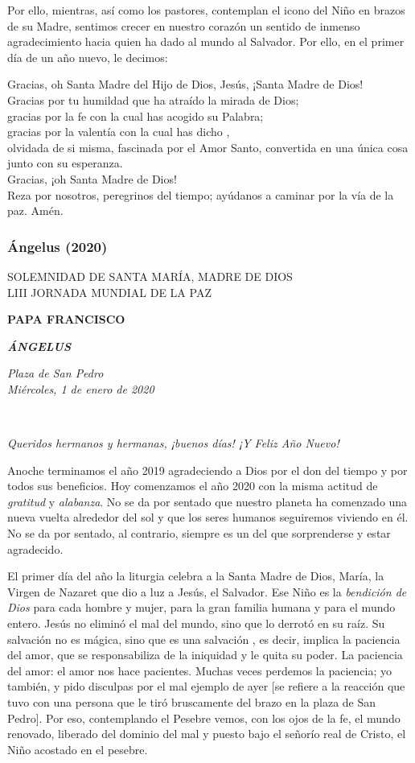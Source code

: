 Por ello, mientras, así como los pastores, contemplan el icono del Niño en brazos de su Madre, sentimos crecer en nuestro corazón un sentido de inmenso agradecimiento hacia quien ha dado al mundo al Salvador. Por ello, en el primer día de un año nuevo, le decimos:

Gracias, oh Santa Madre del Hijo de Dios, Jesús, ¡Santa Madre de Dios!\\ Gracias por tu humildad que ha atraído la mirada de Dios;\\ gracias por la fe con la cual has acogido su Palabra;\\ gracias por la valentía con la cual has dicho ,\\ olvidada de si misma, fascinada por el Amor Santo, convertida en una única cosa junto con su esperanza.\\ Gracias, ¡oh Santa Madre de Dios!\\ Reza por nosotros, peregrinos del tiempo; ayúdanos a caminar por la vía de la paz. Amén.

\subsubsection{Ángelus (2020)} SOLEMNIDAD DE SANTA MARÍA, MADRE DE DIOS\\ LIII JORNADA MUNDIAL DE LA PAZ

\textbf{PAPA FRANCISCO}

\textbf{\emph{ÁNGELUS}}

\emph{Plaza de San Pedro\\ Miércoles, 1 de enero de 2020}

~

\emph{Queridos hermanos y hermanas, ¡buenos días! ¡Y Feliz Año Nuevo!}

Anoche terminamos el año 2019 agradeciendo a Dios por el don del tiempo y por todos sus beneficios. Hoy comenzamos el año 2020 con la misma actitud de \emph{gratitud} y \emph{alabanza}. No se da por sentado que nuestro planeta ha comenzado una nueva vuelta alrededor del sol y que los seres humanos seguiremos viviendo en él. No se da por sentado, al contrario, siempre es un  del que sorprenderse y estar agradecido.

El primer día del año la liturgia celebra a la Santa Madre de Dios, María, la Virgen de Nazaret que dio a luz a Jesús, el Salvador. Ese Niño es la \emph{bendición de Dios} para cada hombre y mujer, para la gran familia humana y para el mundo entero. Jesús no eliminó el mal del mundo, sino que lo derrotó en su raíz. Su salvación no es mágica, sino que es una salvación , es decir, implica la paciencia del amor, que se responsabiliza de la iniquidad y le quita su poder. La paciencia del amor: el amor nos hace pacientes. Muchas veces perdemos la paciencia; yo también, y pido disculpas por el mal ejemplo de ayer {[}se refiere a la reacción que tuvo con una persona que le tiró bruscamente del brazo en la plaza de San Pedro{]}. Por eso, contemplando el Pesebre vemos, con los ojos de la fe, el mundo renovado, liberado del dominio del mal y puesto bajo el señorío real de Cristo, el Niño acostado en el pesebre.

